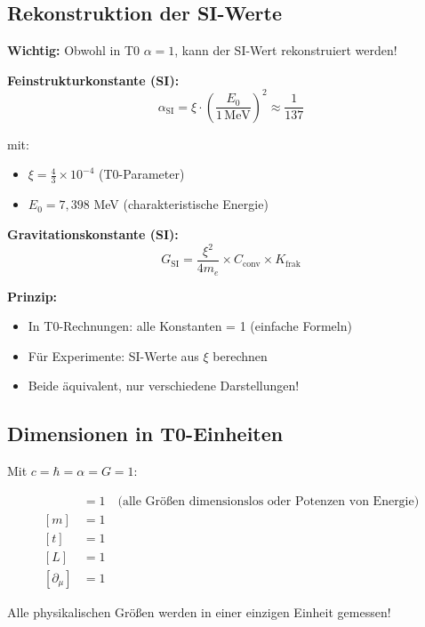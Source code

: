 	\subsection{Rekonstruktion der SI-Werte}
	
	\textbf{Wichtig:} Obwohl in T0 $\alpha = 1$, kann der SI-Wert rekonstruiert werden!
	
	\textbf{Feinstrukturkonstante (SI):}
	\begin{equation}
		\alpha_{\text{SI}} = \xi \cdot \left(\frac{E_0}{1\,\text{MeV}}\right)^2 \approx \frac{1}{137}
	\end{equation}
	
	mit:
	\begin{itemize}
		\item $\xi = \frac{4}{3} \times 10^{-4}$ (T0-Parameter)
		\item $E_0 = 7{,}398$ MeV (charakteristische Energie)
	\end{itemize}
	
	\textbf{Gravitationskonstante (SI):}
	\begin{equation}
		G_{\text{SI}} = \frac{\xi^2}{4m_e} \times C_{\text{conv}} \times K_{\text{frak}}
	\end{equation}
	
	\textbf{Prinzip:} 
	\begin{itemize}
		\item In T0-Rechnungen: alle Konstanten = 1 (einfache Formeln)
		\item Für Experimente: SI-Werte aus $\xi$ berechnen
		\item Beide äquivalent, nur verschiedene Darstellungen!
	\end{itemize}
	
	\subsection{Dimensionen in T0-Einheiten}
	
	Mit $c = \hbar = \alpha = G = 1$:
	
	\begin{align}
		[E] &= 1 \quad \text{(alle Größen dimensionslos oder Potenzen von Energie)} \\
		[m] &= 1 \\
		[t] &= 1 \\
		[L] &= 1 \\
		[\partial_\mu] &= 1
	\end{align}
	
	Alle physikalischen Größen werden in einer einzigen Einheit gemessen!
	

